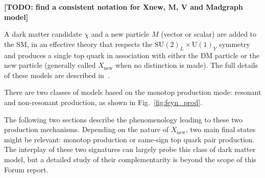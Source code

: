 \textbf{[TODO: find a consistent notation for Xnew, M, V and Madgraph model]}

\newcommand{\SUtwoUone}{\ensuremath{\mathrm{SU}(2)_{L} \times \mathrm{U}(1)_{Y}}\xspace}
\newcommand{\SUtwo}{\ensuremath{\mathrm{SU}(2)_{L}}\xspace}
\newcommand{\Lagr}{\ensuremath{\mathcal{L}}\xspace}
\newcommand{\fmet}{\ensuremath{f_{\mathrm{met}}}\xspace}
\newcommand{\met}{MET\xspace}
\newcommand{\ares}{\ensuremath{a_{\mathrm{res}}}\xspace}
\newcommand{\anonres}{\ensuremath{a_{\mathrm{non-res}}}\xspace}
\newcommand{\Xnew}{\ensuremath{X_{\mathrm{new}}}\xspace}
\newcommand{\BR}[2]{\ensuremath{\mathrm{BR}({#1} \to {#2})}\xspace}
\newcommand{\ssll}{\ensuremath{\ell^{+}\ell^{+}}\xspace}
\newcommand{\ttbarV}{\ensuremath{\ttbar V}\xspace}
\def\mfmet{\ensuremath{m(f_{\mathrm{met}})}}
\def\mvmet{\ensuremath{m(v_{\mathrm{met}})}}
\def\vmet{\ensuremath{v_{\mathrm{met}}}}
\def\fmet{\ensuremath{f_{\mathrm{met}}}}


A dark matter candidate $\chi$ and a new particle $M$ (vector or scalar) 
are added to the SM, in an effective theory that respects the $\SUtwoUone$ symmetry 
and produces a single top quark in association with either the DM particle or the new particle
(generally called $\Xnew$ when no distinction is made). The full details of 
these models are described in~\cite{AndreaFuksMaltoni,Agram:2013wda,Boucheneb:2014wza}. 

There are two classes of models based on the monotop production mode: 
resonant and non-resonant production, as shown 
in Fig.~\ref{fig:feyn_prod}. 

The following two sections describe the phenomenology leading to these two production mechanisms.
Depending on the nature of $\Xnew$, two main final states might be relevant: 
monotop production or same-sign top quark pair production. 
The interplay of these two signatures can largely probe this class of dark matter model,
but a detailed study of their complementarity is beyond the scope of this Forum report. 

